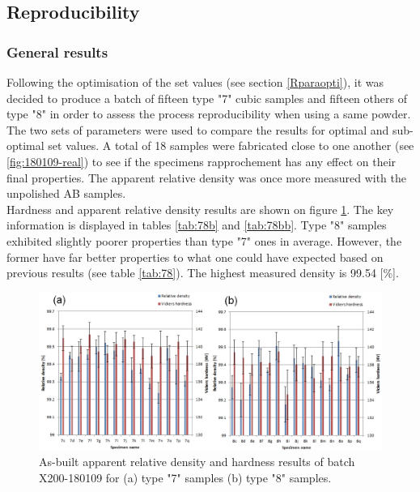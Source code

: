\subsection{Reproducibility}
\label{RReprod}
\subsubsection{General results}
Following the optimisation of the set values (see section \ref{Rparaopti}), it was decided to produce a batch of fifteen type "7" cubic samples and fifteen others of type "8" in order to assess the process reproducibility when using a same powder. The two sets of parameters were used to compare the results for optimal and sub-optimal set values. A total of 18 samples were fabricated close to one another (see \ref{fig:180109-real}) to see if the specimens rapprochement has any effect on their final properties. The apparent relative density was once more measured with the unpolished AB samples.\\

Hardness and apparent relative density results are shown on figure \ref{fig:HD-171024}. The key information is displayed in tables \ref{tab:78b} and \ref{tab:78bb}. Type "8" samples exhibited slightly poorer properties than type "7" ones in average. However, the former have far better properties to what one could have expected based on previous results (see table \ref{tab:78}). The highest measured density is 99.54 [\%].\\

\begin{figure}[ht]
\centering
\centerline{\includegraphics[scale=0.65]{Images/HD-180109-both}}
\decoRule
\caption[As-built apparent relative density and hardness results of batch X200-180109 for (a) type "7" samples (b) type "8" samples.]{As-built apparent relative density and hardness results of batch X200-180109 for (a) type "7" samples (b) type "8" samples.}
\label{fig:HD-171024}
\end{figure} 


